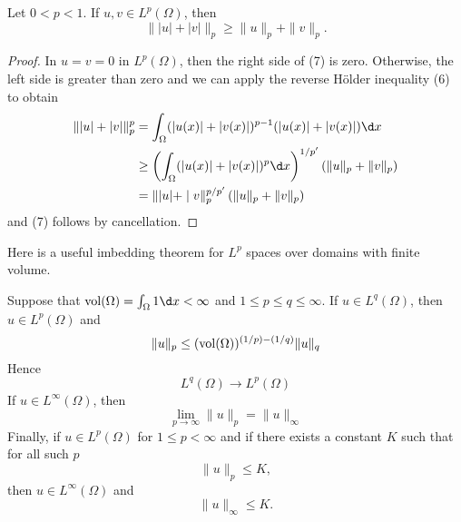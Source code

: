 \begin{theorem}
  Let $0<p<1$. If $u, v \in L^p(\Omega)$, then
  \begin{equation}\label{eq:2.7}
    \||u|+|v|\|_p \geq\|u\|_p+\|v\|_p .
  \end{equation}
\end{theorem}

\begin{proof}
  In $u=v=0$ in $L^p(\Omega)$, then the right side of (7) is zero. Otherwise, the left side is greater than zero and we can apply the reverse Hölder inequality (6) to obtain
  \[
  \begin{aligned}
  \||u|+|v|\|_p^p & =\int_{\Omega}(|u(x)|+|v(x)|)^{p-1}(|u(x)|+|v(x)|) \d x \\
  & \geq\left(\int_{\Omega}(|u(x)|+|v(x)|)^p \d x\right)^{1 / p^{\prime}}\left(\|u\|_p+\|v\|_p\right) \\
  & =\||u|+\mid v\|_p^{p / p^{\prime}}\left(\|u\|_p+\|v\|_p\right)
  \end{aligned}
  \]
  and (7) follows by cancellation.
\end{proof}

Here is a useful imbedding theorem for $L^p$ spaces over domains with finite volume.

\begin{theorem}
  Suppose that $\vol(\Omega)=\int_{\Omega} 1 \d x<\infty$ and $1 \leq p \leq q \leq \infty$. If $u \in L^q(\Omega)$, then $u \in L^p(\Omega)$ and
  \begin{equation}\label{eq:2.8}
    \|u\|_p \leq(\operatorname{vol}(\Omega))^{(1 / p)-(1 / q)}\|u\|_q
  \end{equation}
  Hence
  \begin{equation}\label{eq:2.9}
    L^q(\Omega) \rightarrow L^p(\Omega)
  \end{equation}
  If $u \in L^{\infty}(\Omega)$, then
  \begin{equation}\label{eq:2.10}
    \lim _{p \rightarrow \infty}\|u\|_p=\|u\|_{\infty}
  \end{equation}
  Finally, if $u \in L^p(\Omega)$ for $1 \leq p<\infty$ and if there exists a constant $K$ such that for all such $p$
  \begin{equation}\label{eq:2.11}
    \|u\|_p \leq K,
  \end{equation}
  then $u\in L^\infty(\Omega)$ and
  \begin{equation}\label{eq:2.12}
    \|u\|_\infty \leq K.
  \end{equation}
\end{theorem}

